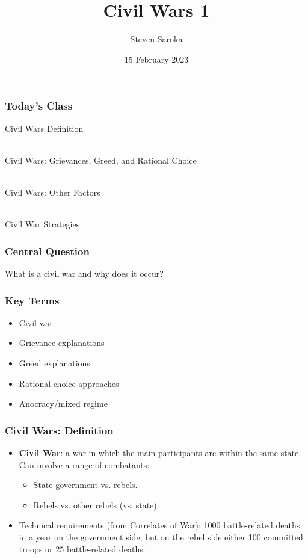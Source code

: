 \documentclass[handout]{beamer}
\title[Civil Wars 1]{\LARGE{Civil Wars 1}}
\author[POLI 150]{Steven Saroka}
\institute{POLI 150}
\date{15 February 2023}
\begin{document}
\begin{frame}
\titlepage %
\end{frame}





	\begin{frame} 
	\frametitle{\LARGE{Today's Class}}
	\begin{itemize}
		\Large{
			\item Civil Wars Definition
			\\~\\ 
			\item Civil Wars: Grievances, Greed, and Rational Choice
			\\~\\
			\item Civil Wars: Other Factors
			\\~\\
			\item Civil War Strategies
		}
	\end{itemize}
\end{frame}

\begin{frame} 
	\frametitle{\LARGE{Central Question}}
    \centering
    \Large{What is a civil war and why does it occur?} 
\end{frame}

\begin{frame} 
	\frametitle{\LARGE{Key Terms}}
	\begin{itemize}
		\item Civil war
		\item Grievance explanations
		\item Greed explanations
		\item Rational choice approaches
		\item Anocracy/mixed regime
	\end{itemize}
\end{frame}

\begin{frame} 
\frametitle{\LARGE{Civil Wars: Definition}}
\begin{itemize}
		\item \textbf{Civil War}: a war in which the main participants are within the same state. Can involve a range of combatants: \pause
		\begin{itemize}
		    \item State government vs. rebels. \pause
		    \item Rebels vs. other rebels (vs. state). \pause
		\end{itemize}
		\item Technical requirements (from Correlates of War): 1000 battle-related deaths in a year on the government side, but on the rebel side either 100 committed troops or 25 battle-related deaths.
\end{itemize}
\end{frame}
\end{document}
